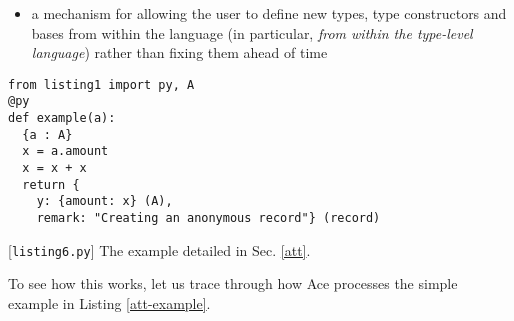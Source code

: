 \documentclass[10pt,preprint]{sigplanconf}
\begin{document}
{\begin{itemize}
\begin{itemize}
  \item a type or type constructor extracted from a subterm
  \item a per-function base semantics (or simply \emph{base}) for forms for which this is not possible  (variables, literals without ascriptions and most statements)
  \end{itemize}
\item a mechanism for allowing the user to define new types, type constructors and bases from within the language (in particular, \emph{from within the type-level language}) rather than fixing them ahead of time
\end{itemize}
\begin{codelisting}
\begin{lstlisting}
from listing1 import py, A
@py
def example(a):
  {a : A}
  x = a.amount
  x = x + x
  return {
    y: {amount: x} (A),
    remark: "Creating an anonymous record"} (record)
\end{lstlisting}
\caption{[\texttt{listing6.py}] The example detailed in Sec. \ref{att}.}
\label{att-example}
\end{codelisting}

To see how this works, let us trace through how Ace processes the simple example in Listing \ref{att-example}. 

}
\end{document}
